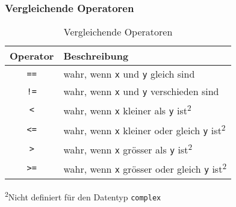 \begin{minipage}[t]{0.49\textwidth}
	\subsubsection{Vergleichende Operatoren}
	\begin{table}[H]
		\begin{threeparttable}
			\caption{Vergleichende Operatoren}
			\begin{tabular}{|c|l|}
				\hline 
				\textbf{Operator} &\textbf{Beschreibung}\\ 
				\hline 
				\texttt{==} &wahr, wenn \texttt{x} und \texttt{y} gleich sind\\ 
				\texttt{!=} &wahr, wenn \texttt{x} und \texttt{y} verschieden sind\\ 
				\texttt{<} &wahr, wenn \texttt{x} kleiner als \texttt{y} ist\textsuperscript{2}\\ 
				\texttt{<=} &wahr, wenn \texttt{x} kleiner oder gleich \texttt{y} ist\textsuperscript{2}\\ 
				\texttt{>} &wahr, wenn \texttt{x} grösser als \texttt{y} ist\textsuperscript{2}\\ 
				\texttt{>=} &wahr, wenn \texttt{x} grösser oder gleich \texttt{y} ist\textsuperscript{2}\\ 
				\hline 
			\end{tabular}
			\textsuperscript{2}Nicht definiert für den Datentyp \texttt{complex}\\
		\end{threeparttable}
	\end{table}
\end{minipage}



